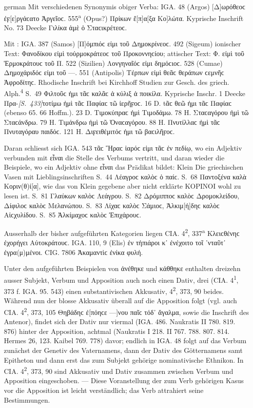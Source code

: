 \begin{otherlanguage*}{german}
Mit verschiedenen Synonymis obiger Verba: IGA. 48 (Argos) [Δ]ωρόθεοϲ ἐ\-ϝ[ε]ρ\-γά\-ϲα\-το Ἀργεῖοϲ. 555\textsuperscript{a} (Opus?) Πρίκων ἔ[π]α[ξα Κο]λώτα. Kyprische Inschrift No. 73 Deecke Γιλίκα ἁμὲ  ὁ Σταϲικρέτεοϲ.

Mit : IGA. 387 (Samos) [Π]όμπιόϲ εἰμι τοῦ Δημοκρίνεοϲ. 492 (Sigeum) ionischer Text: Φανοδίκου εἰμὶ τοὐρμοκράτεοϲ τοῦ Προκοννηϲίου; attischer Text: Φ. εἰμὶ τοῦ Ἑρμοκράτουϲ τοῦ Π. 522 (Sizilien) Λονγηναῖόϲ εἰμι δημόϲιοϲ. 528 (Cumae) Δημοχάριδόϲ εἰμι τοῦ —. 551 (Antipolis) Τέρπων εἰμὶ θεᾶϲ θεράπων ϲεμ\-νῆϲ Ἀφροδίτηϲ. Rhodische Inschrift bei Kirchhoff Studien zur Gesch. des griech. Alph.\textsuperscript{4} S.~49 Φιλτοῦϲ ἠμι τᾶϲ καλᾶϲ ἁ κύλιξ ἁ ποικίλα. Kyprische Inschr. 1 Deecke Πρα-\hypertarget{p433}{\emph{[S.~433]}}\label{p433}τοτίμω ἠμὶ τᾶϲ Παφίαϲ τῶ ἰερῆϝοϲ. 16 D. tᾶϲ θεῶ ἠμι τᾶϲ Παφίαϲ (ebenso 65. 66 Hoffm.). 23 D. Τιμοκύπραϲ ἠμὶ Τιμοδάμω. 78 Η. Σταϲαγόρου ἠμὶ τῶ Σταϲάνδρω. 79 Η. Τιμάνδρω ἠμὶ τῶ Ὀναϲαγόρου. 88 Η. Πνυτίλλαϲ ἠμὶ τᾶϲ Πνυταγόραυ παιδόϲ. 121 Η. Διϝειθέμιτόϲ ἠμι τῶ βαϲιλῆϝοϲ.

Daran schliesst sich IGA. 543 τᾶϲ Ἥραϲ ἱαρόϲ εἰμι τᾶϲ ἐν πεδίῳ, wo ein Adjektiv verbunden mit εἶναι die Stelle des Verbums vertritt, und daran wieder die Beispiele, wo ein Adjektiv ohne εἶναι das Prädikat bildet: Klein Die griechischen Vasen mit Lieblingsinschriften S.~44 Λέαγροϲ καλὸϲ ὁ παίϲ. S.~68 Παντοξένα καλὰ Κοριν(θ)ί[α], wie das von Klein gegebene aber nicht erklärte ΚΟΡΙΝΟΙ wohl zu lesen ist. S.~81 Γλαύκων καλὸϲ Λεάγρου. S.~82 Δρόμιπποϲ καλὸϲ Δρομοκλείδου, Δίφιλοϲ καλὸϲ Μελανώπου. S.~83 Λίχαϲ καλὸϲ Σάμιοϲ, Ἀλκιμ[ή]δηϲ καλὸϲ Αἰϲ\-χυ\-λί\-δου. S.~85 Ἀλκίμαχοϲ καλὸϲ Ἐπιχάρουϲ.

Ausserhalb der bisher aufgeführten Kategorien liegen CIA. 4\textsuperscript{2}, 337\textsuperscript{a} Κλειϲθένηϲ ἐχορήγει Αὐτοκράτουϲ. IGA. 110, 9 (Elis) ἐν τἠπιάροι κ᾽ ἐνέχοιτο τοῖ ᾽νταῦτ᾽ ἐγρα(μ)μένοι. CIG. 7806 Ἀκαμαντὶϲ ἐνίκα φυλή.

Unter den aufgeführten Beispielen von ἀνέθηκε und κάθθηκε enthalten dreizehn ausser Subjekt, Verbum und Apposition auch noch einen Dativ, drei (CIA. 4\textsuperscript{1}, 373 f. IGA. 95. 543) einen substantivischen Akkusativ, 4\textsuperscript{2}, 373, 90 beides. Während nun der blosse Akkusativ überall auf die Apposition folgt (vgl. auch CIA. 4\textsuperscript{2}, 373, 105 Θηβάδηϲ ἐ[πόηϲε —]νου παῖϲ τόδ᾽ ἄγαλμα, sowie die Inschrift des Antenor), findet sich der Dativ nur viermal (IGA. 486. Naukratis II 780. 819. 876) hinter der Apposition, achtmal (Naukratis I 218. II 767. 788. 807. 814. Hermes 26, 123. Kaibel 769. 778) davor; endlich in IGA. 48 folgt auf das Verbum zunächst der Genetiv des Vaternamens, dann der Dativ des Götternamens samt Epitheton und dann erst das zum Subjekt gehörige nominativische Ethnikon. In CIA. 4\textsuperscript{2}, 373, 90 sind Akkusativ und Dativ zusammen zwischen Verbum und Apposition eingeschoben. — Diese Voranstellung der zum Verb gehörigen Kasus vor die Apposition ist leicht verständlich; das Verb attrahiert seine Bestimmungen.


\end{otherlanguage*}
